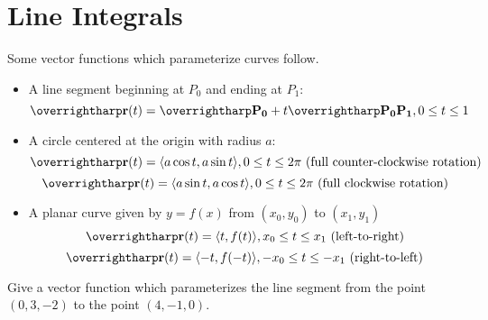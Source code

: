 \documentclass[letterpaper, twoside, 12pt]{book}
\begin{document}
          \begin{solution}

          \end{solution}

          \begin{contributors}

          \end{contributors}


\section{Line Integrals} %

\begin{theorem}
  Some vector functions which parameterize curves follow.
  \begin{itemize}
    \item
    A line segment beginning at $P_0$ and ending at $P_1$:
      \[
        \vect{r}(t) = \vect{P_0} + t\vect{P_0P_1}, 0\leq t\leq 1
      \]
    \item
    A circle centered at the origin with radius $a$:
      \[
        \vect{r}(t) = \<a\cos t,a\sin t\>, 0\leq t\leq 2\pi
        \text{ (full counter-clockwise rotation)}
      \]
      \[
        \vect{r}(t) = \<a\sin t,a\cos t\>, 0\leq t\leq 2\pi
        \text{ (full clockwise rotation)}
      \]
    \item
    A planar curve given by $y=f(x)$ from $(x_0,y_0)$ to $(x_1,y_1)$
      \[
        \vect{r}(t) = \<t,f(t)\>, x_0\leq t\leq x_1
        \text{ (left-to-right)}
      \]
      \[
        \vect{r}(t) = \<-t,f(-t)\>, -x_0\leq t\leq -x_1
        \text{ (right-to-left)}
      \]
    \end{itemize}
\end{theorem}

          \begin{problem}
            Give a vector function which parameterizes the line segment
            from the point $(0,3,-2)$ to the point $(4,-1,0)$.
          \end{problem}

          \begin{solution}

          \end{solution}

          \begin{contributors}

          \end{contributors}
\end{document}

